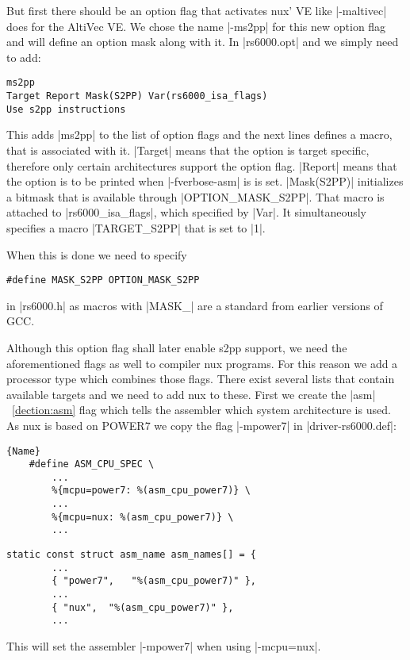 But first there should be an option flag that activates nux' VE like |-maltivec| does for the AltiVec VE.
We chose the name |-ms2pp| for this new option flag and will define an option mask along with it.
In |rs6000.opt| and we simply need to add:
\begin{lstlisting}
ms2pp
Target Report Mask(S2PP) Var(rs6000_isa_flags)
Use s2pp instructions
\end{lstlisting}
This adds |ms2pp| to the list of option flags and the next lines defines a macro, that is associated with it.
|Target| means that the option is target specific, therefore only certain architectures support the option flag.
|Report| means that the option is to be printed when |-fverbose-asm| is is set.
|Mask(S2PP)| initializes a bitmask that is available through |OPTION_MASK_S2PP|.
That macro is attached to |rs6000_isa_flags|, which specified by |Var|.
It simultaneously specifies a macro |TARGET_S2PP| that is set to |1|. \cite{GCCint:options}

When this is done we need to specify 
\begin{lstlisting}
#define MASK_S2PP OPTION_MASK_S2PP
\end{lstlisting}
in |rs6000.h| as macros with |MASK_| are a standard from earlier versions of GCC.

Although this option flag shall later enable s2pp support, we need the aforementioned flags as well to compiler nux programs.
For this reason we add a processor type which combines those flags.
There exist several lists that contain available targets and we need to add nux to these.
First we create the |asm|~\ref{dection:asm} flag which tells the assembler which system architecture is used.
As nux is based on POWER7 we copy the flag |-mpower7| in |driver-rs6000.def|:

    \begin{lstlisting}[caption=rs6000.h]{Name}
    #define ASM_CPU_SPEC \
        ...
        %{mcpu=power7: %(asm_cpu_power7)} \
        ...
        %{mcpu=nux: %(asm_cpu_power7)} \
        ...
    \end{lstlisting}
    \begin{lstlisting}[caption=driver-rs6000.c]
    static const struct asm_name asm_names[] = {
        ...
        { "power7",   "%(asm_cpu_power7)" },
        ...
        { "nux",  "%(asm_cpu_power7)" },
        ...
    \end{lstlisting}

This will set the assembler |-mpower7| when using |-mcpu=nux|.


